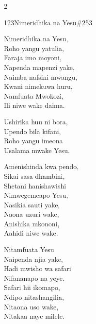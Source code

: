 \documentclass{article}
\begin{document}
\begin{multicols}{2}
\begin{hymn}{123}{Nimeridhika na Yesu}{\#253}
\begin{stanza}
Nimeridhika na Yesu,\\
Roho yangu yatulia,\\
Faraja imo moyoni,\\
Napenda mapenzi yake,\\
Naimba nafsini mwangu,\\
Kwani nimekuwa huru,\\
Namfuata Mwokozi,\\
Ili niwe wake daima.
\end{stanza}
\begin{chorus}
Ushirika huu ni bora,\\
Upendo bila kifani,\\
Roho yangu imeona\\
Usalama mwake Yesu.
\end{chorus}
\begin{stanza}
Amenishinda kwa pendo,\\
Sikai sasa dhambini,\\
Shetani hanishawishi\\
Nimwegemeapo Yesu,\\
Nasikia sauti yake,\\
Naona uzuri wake,\\
Anishika mkononi,\\
Aahidi niwe wake.
\end{stanza}
\begin{stanza}
Nitamfuata Yesu\\
Naipenda njia yake,\\
Hadi mwisho wa safari\\
Nifananapo na yeye.\\
Safari hii ikomapo,\\
Ndipo nitashangilia,\\
Nitaona uso wake,\\
Nitakaa naye milele.
\end{stanza}
\end{hymn}


\end{multicols}
\end{document}
